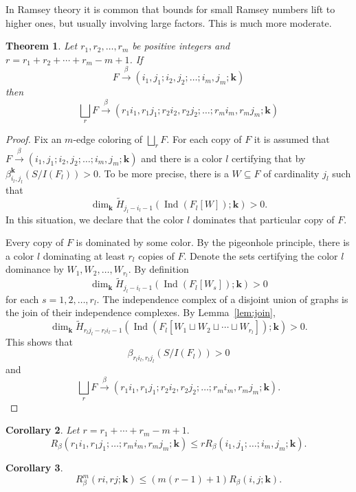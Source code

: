 \documentclass{article}
\theoremstyle{plain}
\newtheorem{thm}{Theorem}
\newtheorem{cor}[thm]{Corollary}
\theoremstyle{definition}
\begin{document}
In Ramsey theory it is common that bounds for small Ramsey numbers lift to higher ones, but usually involving large factors. This is much more moderate.

\begin{thm}\label{thm:lift}
Let $r_1, r_2, \ldots, r_m$ be positive integers and $r=r_1+r_2+\cdots + r_m - m + 1$. If
\[ F \xrightarrow{\beta} (i_1,j_1;i_2,j_2;\ldots;i_m,j_m; \mathbf{k} ) \]
then
\[ \bigsqcup_r F  \xrightarrow{\beta} (r_1i_1,r_1j_1;r_2i_2,r_2j_2;\ldots;r_mi_m,r_mj_m; \mathbf{k})   \]
\end{thm}
\begin{proof} Fix an $m$-edge coloring of $\bigsqcup_r F.$ For each copy of $F$ it is assumed that $F \xrightarrow{\beta} (i_1,j_1;i_2,j_2;\ldots;i_m,j_m; \mathbf{k} )$
and there is a color $l$ certifying that by $\beta_{i_l,j_l}^{\mathbf{k}}(S/I(F_l))>0.$ To be more precise, there is a $W\subseteq F$ of cardinality $j_l$ such that
\[
\dim_{\mathbf{k}} \widetilde{H}_{j_l - i_l - 1}(\operatorname{Ind}(F_l[W]); \mathbf{k}) >0.
\]
In this situation, we declare that the color $l$ dominates that particular copy of $F.$

Every copy of $F$ is dominated by some color. By the pigeonhole principle, there is a color $l$ dominating at least $r_l$ copies of $F.$ Denote the sets certifying the color $l$ dominance by
$W_1, W_2, \ldots, W_{r_l}.$ By definition
\[
\dim_{\mathbf{k}} \widetilde{H}_{j_l - i_l - 1}(\operatorname{Ind}(F_l[W_s]); \mathbf{k}) >0
\]
for each $s=1,2,\ldots, r_l.$ The independence complex of a disjoint union of graphs is the join of their independence complexes. By Lemma~\ref{lem:join},
\[
\dim_{\mathbf{k}} \widetilde{H}_{r_lj_l - r_li_l - 1}(\operatorname{Ind}(F_l[W_1 \sqcup W_2 \sqcup \cdots \sqcup W_{r_l}   ]); \mathbf{k}) >0.
\]
This shows that
\[
\beta_{r_li_l,r_lj_l}(S/I(F_l))>0
\]
and
\[ \bigsqcup_r F  \xrightarrow{\beta} (r_1i_1,r_1j_1;r_2i_2,r_2j_2;\ldots;r_mi_m,r_mj_m; \mathbf{k}).   \]
\end{proof}

\begin{cor}\label{cor:lift} Let $r=r_1+\cdots + r_m -m+1.$
\[R_\beta (r_1i_1,r_1j_1 ;\ldots;r_mi_m,r_mj_m; \mathbf{k})
\leq  r R_\beta (i_1,j_1 ;\ldots;i_m,j_m; \mathbf{k}).
\]
\end{cor}

\begin{cor}
\[R_\beta^m (ri,rj ; \mathbf{k})
\leq  (m(r-1)+1) R_\beta (i,j ; \mathbf{k}).
\]
\end{cor}
\end{document}
